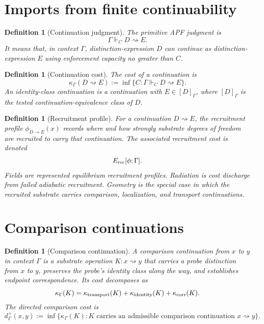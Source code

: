 \documentclass[11pt]{article}
\newtheorem{definition}[theorem]{Definition}
\theoremstyle{remark}
\newcommand{\G}{\Gamma}
\newcommand{\entails}{\Vdash}
\newcommand{\goes}{\rightsquigarrow}
\newcommand{\Cost}{\kappa}
\newcommand{\Erec}{E_{\rm rec}}
\newcommand{\phide}{\phi_{D\to E}}
\begin{document}
\section{Imports from finite continuability}

\begin{definition}[Continuation judgment]
The primitive APF judgment is
\[
        \G\entails_C D\goes E.
\]
It means that, in context \(\G\), distinction-expression \(D\) can continue as distinction-expression \(E\) using enforcement capacity no greater than \(C\).
\end{definition}

\begin{definition}[Continuation cost]
The cost of a continuation is
\[
        \Cost_\G(D\goes E)
        :=
        \inf\{C:\G\entails_C D\goes E\}.
\]
An identity-class continuation is a continuation with \(E\in[D]_\G\), where \([D]_\G\) is the tested continuation-equivalence class of \(D\).
\end{definition}

\begin{definition}[Recruitment profile]
For a continuation \(D\goes E\), the recruitment profile \(\phide(x)\) records where and how strongly substrate degrees of freedom are recruited to carry that continuation.  The associated recruitment cost is denoted
\[
        \Erec[\phi;\G].
\]
Fields are represented equilibrium recruitment profiles.  Radiation is cost discharge from failed adiabatic recruitment.  Geometry is the special case in which the recruited substrate carries comparison, localization, and transport continuations.
\end{definition}

\section{Comparison continuations}

\begin{definition}[Comparison continuation]
A comparison continuation from \(x\) to \(y\) in context \(\G\) is a substrate operation \(K:x\goes y\) that carries a probe distinction from \(x\) to \(y\), preserves the probe's identity class along the way, and establishes endpoint correspondence.  Its cost decomposes as
\[
\Cost_\G(K)
=
\Cost_{\rm transport}(K)
+
\Cost_{\rm identity}(K)
+
\Cost_{\rm corr}(K).
\]
The directed comparison cost is
\[
        d^+_\G(x,y)
        :=
        \inf\{\Cost_\G(K):K\text{ carries an admissible comparison continuation }x\goes y\}.
\]
\end{definition}
\end{document}
